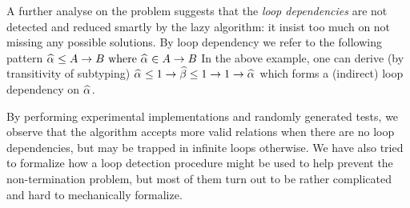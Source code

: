 
A further analyse on the problem suggests that the \emph{loop dependencies} are not detected
and reduced smartly by the lazy algorithm:
it insist too much on not missing any possible solutions.
By loop dependency we refer to the following pattern
$\al \le A \to B \text{ where } \al \in A \to B$
In the above example, one can derive (by transitivity of subtyping)
$\al \le 1 \to \bt \le 1 \to 1 \to \al$
which forms a (indirect) loop dependency on $\al$.

By performing experimental implementations and randomly generated tests,
we observe that the algorithm accepts more valid relations when there are no loop dependencies,
but may be trapped in infinite loops otherwise.
We have also tried to formalize how a loop detection procedure might be used to help
prevent the non-termination problem,
but most of them turn out to be rather complicated and hard to mechanically formalize.


